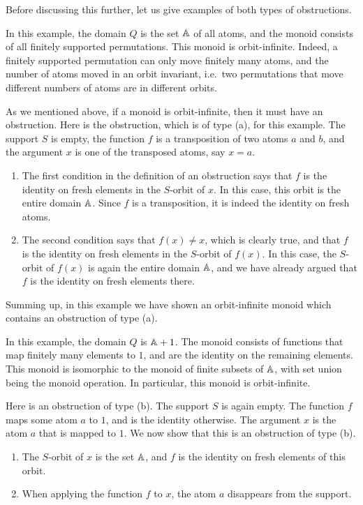  Before discussing this further, let us give examples of both types of obstructions.
 

\begin{myexample} In this example, the domain $Q$ is the set $\mathbb A$ of all atoms, and the monoid consists of all finitely supported permutations. This monoid is orbit-infinite. Indeed, 
a finitely supported permutation can only move finitely many atoms, and the number of atoms moved in an orbit invariant, i.e.~two permutations that move different numbers of atoms are in different orbits.

As we mentioned above, if a monoid is orbit-infinite, then it must have an obstruction. Here is the obstruction, which is of type (a), for this example. The support $S$ is empty, the function $f$ is a transposition of two atoms $a$ and $b$, and the argument $x$ is one of the transposed atoms, say $x=a$.  
\begin{enumerate}
    \item   The first condition in the definition of an obstruction says  that $f$ is the identity on fresh elements in the $S$-orbit of $x$. In this case, this orbit is the entire domain $\mathbb A$. Since $f$ is a transposition, it is indeed the identity on fresh atoms. 
    \item  The second condition says that $f(x) \neq x$, which is clearly true, and that $f$ is the identity on fresh elements in the $S$-orbit of $f(x)$. In this case, the $S$-orbit of $f(x)$ is again the entire domain $\mathbb A$, and we have already argued that $f$ is the identity on fresh elements there.  
\end{enumerate}
Summing up, in this example we have shown an orbit-infinite monoid which contains an obstruction of type (a).
\end{myexample}

\begin{myexample}
 In this example, the domain $Q$ is $\mathbb A + 1$. The monoid consists of functions that map finitely many elements to $1$, and are the identity on the remaining elements. This monoid is isomorphic to the monoid of finite subsets of $\mathbb A$, with set union being the monoid operation. In particular, this monoid is orbit-infinite. 

Here is an obstruction of type (b). The support $S$ is again empty. The function $f$ maps some atom $a$ to $1$, and is the identity otherwise. The argument $x$ is the atom $a$ that is mapped to $1$. We now show that this is an obstruction of type (b).
\begin{enumerate}
    \item The $S$-orbit of $x$ is the set $\mathbb A$, and $f$ is the identity on fresh elements of this orbit.  
    \item When applying the function $f$ to $x$, the atom $a$ disappears from the support. 
\end{enumerate}
\end{myexample}


